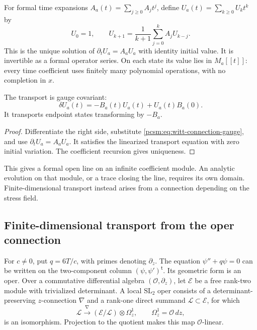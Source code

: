 For formal time expansions \(A_a(t)=\sum_{j\geq0}A_jt^j\),
define \(U_a(t)=\sum_{k\geq0}U_kt^k\) by
\begin{equation}\label{pcsm:eq:witt-transport}
 U_0=1,\qquad
 U_{k+1}=\frac1{k+1}\sum_{j=0}^k A_jU_{k-j}.
\end{equation}
This is the unique solution of \(\partial_tU_a=A_aU_a\) with
identity initial value. It is invertible as a formal operator series.
On each state its value lies in \(M_a[[t]]\): every time coefficient
uses finitely many polynomial operations, with no completion in \(x\).

\begin{proposition}\label{pcsm:prop:witt-transport}
The transport is gauge covariant:
\[
 \delta U_a(t)=-B_a(t)U_a(t)+U_a(t)B_a(0).
\]
It transports endpoint states transforming by \(-B_a\).
\end{proposition}

\begin{proof}
Differentiate the right side, substitute
\eqref{pcsm:eq:witt-connection-gauge}, and use
\(\partial_tU_a=A_aU_a\).
It satisfies the linearized transport equation with zero initial
variation. The coefficient recursion gives uniqueness.
\end{proof}

This gives a formal open line on an infinite coefficient module.
An analytic evolution on that module, or a trace closing the line,
requires its own domain. Finite-dimensional transport instead arises
from a connection depending on the stress field.

\subsection{Finite-dimensional transport from the oper connection}

For\label{pcsm:def:local-oper} \(c\ne0\), put \(q=6T/c\), with primes denoting
\(\partial_z\). The equation \(\psi''+q\psi=0\) can be
written on the two-component column \((\psi,\psi')^{\mathsf t}\).
Its geometric form is an oper.
Over a commutative differential algebra \((\mathcal O,\partial_z)\),
let \(\mathcal E\) be a free rank-two module with trivialized
determinant. A local \(\mathrm{SL}_2\) oper consists of a
determinant-preserving \(z\)-connection \(\nabla\) and a rank-one
direct summand \(\mathcal L\subset\mathcal E\), for which
\[
 \mathcal L\xrightarrow{\nabla}
         (\mathcal E/\mathcal L)\otimes\Omega_z^1,
 \qquad \Omega_z^1=\mathcal O\,dz,
\]
is an isomorphism. Projection to the quotient makes this map
\(\mathcal O\)-linear.

